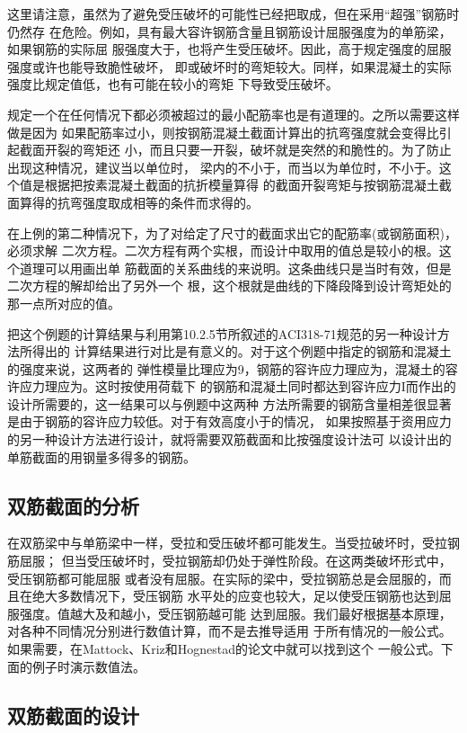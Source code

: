 \documentclass[12pt,a4paper]{book}
\begin{document}
这里请注意，虽然为了避免受压破坏的可能性已经把取成，但在采用“超强”钢筋时仍然存
在危险。例如，具有最大容许钢筋含量且钢筋设计屈服强度为的单筋梁，如果钢筋的实际屈
服强度大于，也将产生受压破坏。因此，高于规定强度的屈服强度或许也能导致脆性破坏，
即或破坏时的弯矩较大。同样，如果混凝土的实际强度比规定值低，也有可能在较小的弯矩
下导致受压破坏。

规定一个在任何情况下都必须被超过的最小配筋率也是有道理的。之所以需要这样做是因为
如果配筋率过小，则按钢筋混凝土截面计算出的抗弯强度就会变得比引起截面开裂的弯矩还
小，而且只要一开裂，破坏就是突然的和脆性的。为了防止出现这种情况，建议当以单位时，
梁内的不小于，而当以为单位时，不小于。这个值是根据把按素混凝土截面的抗折模量算得
的截面开裂弯矩与按钢筋混凝土截面算得的抗弯强度取成相等的条件而求得的。

在上例的第二种情况下，为了对给定了尺寸的截面求出它的配筋率(或钢筋面积)，必须求解
二次方程。二次方程有两个实根，而设计中取用的值总是较小的根。这个道理可以用画出单
筋截面的关系曲线的来说明。这条曲线只是当时有效，但是二次方程的解却给出了另外一个
根，这个根就是曲线的下降段降到设计弯矩处的那一点所对应的值。

把这个例题的计算结果与利用第10.2.5节所叙述的ACI318-71规范的另一种设计方法所得出的
计算结果进行对比是有意义的。对于这个例题中指定的钢筋和混凝土的强度来说，这两者的
弹性模量比理应为9，钢筋的容许应力理应为，混凝土的容许应力理应为。这时按使用荷载下
的钢筋和混凝土同时都达到容许应力I而作出的设计所需要的，这一结果可以与例题中这两种
方法所需要的钢筋含量相差很显著是由于钢筋的容许应力较低。对于有效高度小于的情况，
如果按照基于资用应力的另一种设计方法进行设计，就将需要双筋截面和比按强度设计法可
以设计出的单筋截面的用钢量多得多的钢筋。

\subsection{双筋截面的分析}

在双筋梁中与单筋梁中一样，受拉和受压破坏都可能发生。当受拉破坏时，受拉钢筋屈服；
但当受压破坏时，受拉钢筋却仍处于弹性阶段。在这两类破坏形式中，受压钢筋都可能屈服
或者没有屈服。在实际的梁中，受拉钢筋总是会屈服的，而且在绝大多数情况下，受压钢筋
水平处的应变也较大，足以使受压钢筋也达到屈服强度。值越大及和越小，受压钢筋越可能
达到屈服。我们最好根据基本原理，对各种不同情况分别进行数值计算，而不是去推导适用
于所有情况的一般公式。如果需要，在Mattock、Kriz和Hognestad的论文中就可以找到这个
一般公式。下面的例子时演示数值法。

\subsection{双筋截面的设计}
\end{document}
